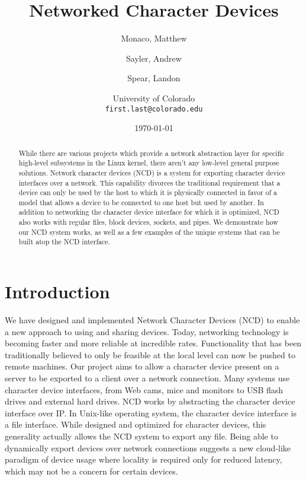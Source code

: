 \documentclass[11pt,twocolumn]{article}
\begin{document}
\title{Networked Character Devices}
\author{Monaco, Matthew \and Sayler, Andrew \and Spear, Landon \\
  \and University of Colorado \\
  \texttt{first.last@colorado.edu}
}
\date{\today}

\maketitle

\begin{abstract}
While there are various projects which provide a network abstraction layer for
specific high-level subsystems in the Linux kernel, there aren't any low-level
general purpose solutions. Network character devices (NCD) is a system for
exporting character device interfaces over a network. This capability
divorces the traditional requirement that a device can only be used by
the host to which it is physically connected in favor of a model that
allows a device to be connected to one host but used by another.
In addition to networking the character device interface for which it
is optimized, NCD also works with regular files, block devices,
sockets, and pipes. We demonstrate how our NCD system works, as well
as a few examples of the unique systems that can be built atop the NCD
interface.
\end{abstract}


\section{Introduction}
\label{sec:introduction}

We have designed and implemented Network Character Devices (NCD) to
enable a new approach to using and sharing devices. Today, networking 
technology is becoming faster and more reliable at incredible rates. 
Functionality that has been traditionally believed to only be 
feasible at the local level can now be pushed to remote
machines. Our project aims to allow 
a character device present on a server to be exported to
a client over a network connection. Many systems use character device
interfaces, from Web cams, mice and monitors to USB flash drives and 
external hard drives. NCD works by abstracting the character device interface 
over IP. In Unix-like operating system, the character device interface
is a file interface. While designed and optimized for
character devices, this generality actually allows the NCD system to export 
any file. Being able to dynamically export devices over network
connections suggests a new cloud-like paradigm of device usage where 
locality is required only for reduced latency, which may not be a
concern for certain devices. 
\end{document}
